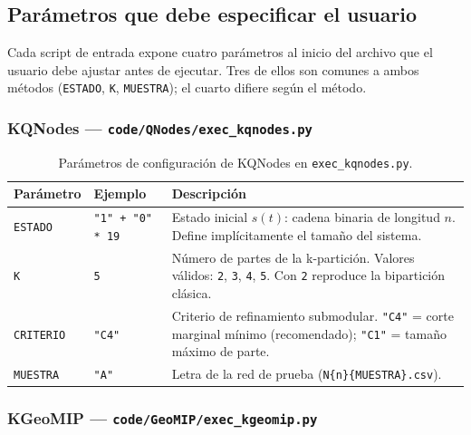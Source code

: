 \subsection{Parámetros que debe especificar el usuario}

Cada script de entrada expone cuatro parámetros al inicio del archivo que el usuario
debe ajustar antes de ejecutar. Tres de ellos son comunes a ambos métodos
(\texttt{ESTADO}, \texttt{K}, \texttt{MUESTRA}); el cuarto difiere según el método.

\subsubsection*{KQNodes — \texttt{code/QNodes/exec\_kqnodes.py}}

\begin{table}[H]
\centering
\begin{tabular}{|l|p{3.5cm}|p{6cm}|}
\hline
\textbf{Parámetro} & \textbf{Ejemplo} & \textbf{Descripción} \\
\hline
\texttt{ESTADO} & \texttt{"1" + "0" * 19} &
  Estado inicial $s(t)$: cadena binaria de longitud $n$.
  Define implícitamente el tamaño del sistema. \\
\hline
\texttt{K} & \texttt{5} &
  Número de partes de la k-partición. Valores válidos: \texttt{2}, \texttt{3},
  \texttt{4}, \texttt{5}. Con \texttt{2} reproduce la bipartición clásica. \\
\hline
\texttt{CRITERIO} & \texttt{"C4"} &
  Criterio de refinamiento submodular.
  \texttt{"C4"} = corte marginal mínimo (recomendado);
  \texttt{"C1"} = tamaño máximo de parte. \\
\hline
\texttt{MUESTRA} & \texttt{"A"} &
  Letra de la red de prueba (\texttt{N\{n\}\{MUESTRA\}.csv}). \\
\hline
\end{tabular}
\caption{Parámetros de configuración de KQNodes en \texttt{exec\_kqnodes.py}.}
\label{tab:params_kqnodes_5}
\end{table}

\subsubsection*{KGeoMIP — \texttt{code/GeoMIP/exec\_kgeomip.py}}

